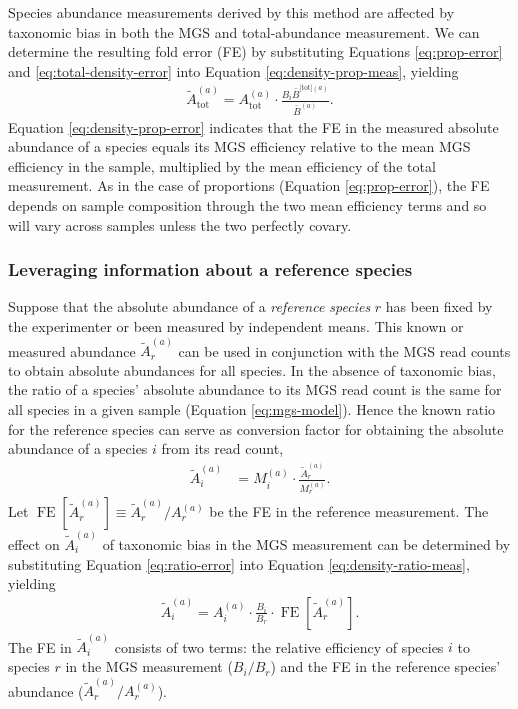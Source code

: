 \documentclass[
]{article}
\begin{document}
Species abundance measurements derived by this method are affected by taxonomic bias in both the MGS and total-abundance measurement.
We can determine the resulting fold error (FE) by substituting Equations \eqref{eq:prop-error} and \eqref{eq:total-density-error} into Equation \eqref{eq:density-prop-meas}, yielding
\begin{align}
  \label{eq:density-prop-error}
  \tilde A_{\text{tot}}^{(a)}
  = A_{\text{tot}}^{(a)} \cdot \frac{B_i \bar B^{{\text{[tot]}}(a)}}{\bar B^{(a)}}.
\end{align}
Equation \eqref{eq:density-prop-error} indicates that the FE in the measured absolute abundance of a species equals its MGS efficiency relative to the mean MGS efficiency in the sample, multiplied by the mean efficiency of the total measurement.
As in the case of proportions (Equation \eqref{eq:prop-error}), the FE depends on sample composition through the two mean efficiency terms and so will vary across samples unless the two perfectly covary.

\hypertarget{leveraging-information-about-a-reference-species}{%
\subsubsection{Leveraging information about a reference species}\label{leveraging-information-about-a-reference-species}}

Suppose that the absolute abundance of a \emph{reference species} \(r\) has been fixed by the experimenter or been measured by independent means.
This known or measured abundance \(\tilde A_{r}^{(a)}\) can be used in conjunction with the MGS read counts to obtain absolute abundances for all species.
In the absence of taxonomic bias, the ratio of a species' absolute abundance to its MGS read count is the same for all species in a given sample (Equation \eqref{eq:mgs-model}).
Hence the known ratio for the reference species can serve as conversion factor for obtaining the absolute abundance of a species \(i\) from its read count,
\begin{align}
  \label{eq:density-ratio-meas}
  \tilde A_i^{(a)} &= M_i^{(a)} \cdot \frac{\tilde A_r^{(a)}}{M_r^{(a)}}.
\end{align}
Let \(\mathop{\mathrm{FE}}[\tilde A_r^{(a)}] \equiv {\tilde A_r^{(a)}}/{A_r^{(a)}}\) be the FE in the reference measurement.
The effect on \(\tilde A_i^{(a)}\) of taxonomic bias in the MGS measurement can be determined by substituting Equation \eqref{eq:ratio-error} into Equation \eqref{eq:density-ratio-meas}, yielding
\begin{align}
  \label{eq:density-ratio-error}
  \tilde A_i^{(a)} = A_i^{(a)} \cdot \frac{B_i}{B_r} \cdot 
    \mathop{\mathrm{FE}}\left[\tilde A_r^{(a)}\right].
\end{align}
The FE in \(\tilde A_i^{(a)}\) consists of two terms: the relative efficiency of species \(i\) to species \(r\) in the MGS measurement (\({B_i}/{B_r}\)) and the FE in the reference species' abundance (\({\tilde A_r^{(a)}}/{A_r^{(a)}}\)).
\end{document}
